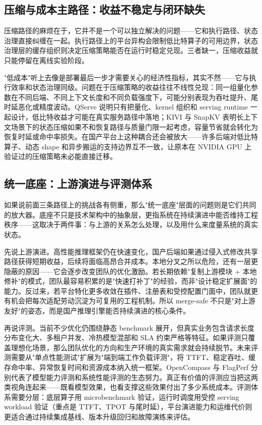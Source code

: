 \subsection{压缩与成本主路径：收益不稳定与闭环缺失}

压缩路径的麻烦在于，它并不是一个可以独立解决的问题——它和执行路径、状态治理直接纠缠在一起。执行路径上的平台异构会限制低比特算子的可用边界，状态治理层的缓存组织则决定压缩策略能否在运行时稳定兑现。三者缺一，压缩收益就只能停留在离线实验阶段。

"低成本"听上去像是部署最后一步才需要关心的经济性指标，其实不然——它与执行效率和状态治理同级。问题在于压缩策略的收益往往不线性兑现：同一组量化参数在不同后端、不同上下文长度和不同负载强度下，可能分别表现为吞吐提升、尾时延恶化或精度波动。QServe 说明只有把量化、kernel 组织和 serving runtime 一起设计，低比特收益才可能在真实服务路径中落地\citep{wang2024qserve}；KIVI 与 SnapKV 表明长上下文场景下的状态压缩如果不和恢复路径与质量门限一起考虑，容量节省就会转化为恢复时延或命中率损失\citep{liu2024kivi,li2024snapkv}。在国产平台上这种耦合还会被放大——许多后端对低比特算子、动态 shape 和异步搬运的支持边界互不一致，让原本在 NVIDIA GPU 上验证过的压缩策略未必能直接迁移。

\subsection{统一底座：上游演进与评测体系}

如果说前面三条路径上的挑战各有侧重，那么"统一底座"层面的问题则是它们共同的放大器。底座不只是技术架构中的抽象层，更指系统在持续演进中能否维持工程秩序——这取决于两件事：与上游的关系怎么处理，以及用什么来度量系统的真实状态。

先说上游演进。高性能推理框架仍在快速变化，国产后端如果通过侵入式修改共享路径获得短期收益，后续将面临高昂合并成本。本地分叉之所以危险，还有一层更隐蔽的原因——它会逐步改变团队的优化激励。若长期依赖"复制上游模块 + 本地修补"的模式，团队最容易积累的是"快速打补丁"的经验，而非"设计稳定扩展面"的能力。反过来，若平台特化更多收敛在插件、注册表和受控配置门面中，团队就更有机会把每次适配劳动沉淀为可复用的工程机制。所以 merge-safe 不只是"对上游友好"的姿态，而是国产推理引擎能否持续演进的核心条件。

再说评测。当前不少优化仍围绕静态 benchmark 展开，但真实业务包含请求长度分布变化大、多租户并发、冷热模型混部和 SLA 约束严格等特征。如果评测只覆盖理想化场景，那么团队优化的方向和生产环境的真实需求就会持续脱节。未来评测需要从"单点性能测试"扩展为"端到端工作负载评测"，将 TTFT、稳定吞吐、缓存命中率、异常恢复时间和资源成本纳入统一框架。OpenCompass 与 FlagPerf 分别代表了模型能力评测和系统性能评测的生态努力\citep{opencompass,flagperf}。真正有价值的评测应当把这两类视角连起来——既看模型效果，也看支撑这些效果付出了多少系统成本。评测体系需要分层：底层算子用 microbenchmark 验证，运行时调度用受控 serving workload 验证（重点是 TTFT、TPOT 与尾时延），平台演进能力和运维代价则更适合通过持续集成基线、版本升级回归和故障演练来评估。
